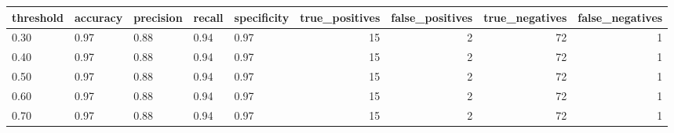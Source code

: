 \begin{tabular}{lllllrrrr}
\toprule
threshold & accuracy & precision & recall & specificity & true\_positives & false\_positives & true\_negatives & false\_negatives \\
\midrule
0.30 & 0.97 & 0.88 & 0.94 & 0.97 & 15 & 2 & 72 & 1 \\
0.40 & 0.97 & 0.88 & 0.94 & 0.97 & 15 & 2 & 72 & 1 \\
0.50 & 0.97 & 0.88 & 0.94 & 0.97 & 15 & 2 & 72 & 1 \\
0.60 & 0.97 & 0.88 & 0.94 & 0.97 & 15 & 2 & 72 & 1 \\
0.70 & 0.97 & 0.88 & 0.94 & 0.97 & 15 & 2 & 72 & 1 \\
\bottomrule
\end{tabular}
